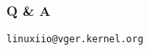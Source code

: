 \documentclass[aspectratio=169]{beamer}
\begin{document}

\begin{frame}
\frametitle{Q \& A}

\begin{figure}
\end{figure}

\centering \texttt{linux\text{-}iio@vger.kernel.org}
\end{frame}


\end{document}
